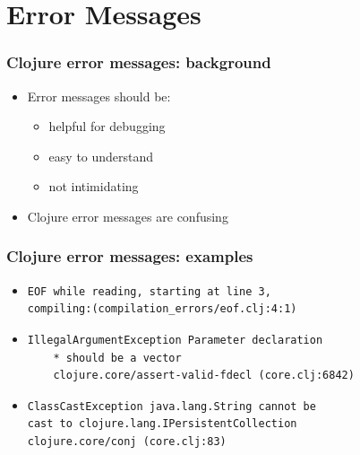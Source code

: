 \documentclass{beamer}
\begin{document}
\section{Error Messages}

\begin{frame}
\frametitle{Clojure error messages: background}
	\begin{itemize}
  		\item Error messages should be:
  		\begin{itemize}
  	 		\item helpful for debugging
  	 		\item easy to understand
  	 		\item not intimidating
  		\end{itemize}
  		\item Clojure error messages are confusing
	 \end{itemize}
	 
\end{frame}

\begin{frame}[fragile]
\frametitle{Clojure error messages: examples}

\begin{itemize}
	\item \begin{verbatim}
EOF while reading, starting at line 3, 
compiling:(compilation_errors/eof.clj:4:1)
\end{verbatim}

	\item \begin{verbatim}
IllegalArgumentException Parameter declaration
	* should be a vector 
	clojure.core/assert-valid-fdecl (core.clj:6842)
\end{verbatim}

\item \begin{verbatim}
ClassCastException java.lang.String cannot be
cast to clojure.lang.IPersistentCollection 
clojure.core/conj (core.clj:83)
\end{verbatim}

\end{itemize}

\end{frame}
\end{document}
